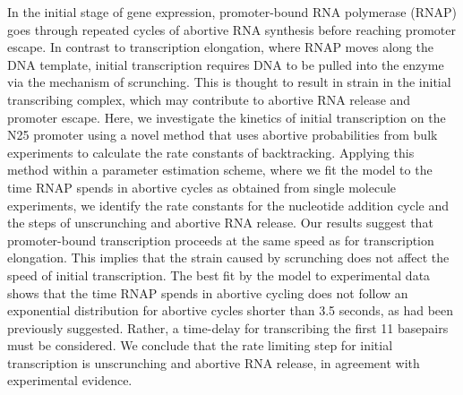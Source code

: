 In the initial stage of gene expression, promoter-bound RNA polymerase (RNAP)
goes through repeated cycles of abortive RNA synthesis before reaching
promoter escape. In contrast to transcription elongation, where RNAP moves
along the DNA template, initial transcription requires DNA to be pulled into
the enzyme via the mechanism of scrunching. This is thought to result in
strain in the initial transcribing complex, which may contribute to abortive
RNA release and promoter escape. Here, we investigate the kinetics of initial
transcription on the N25 promoter using a novel method that uses abortive
probabilities from bulk experiments to calculate the rate constants of
backtracking. Applying this method within a parameter estimation scheme, where
we fit the model to the time RNAP spends in abortive cycles as obtained from
single molecule experiments, we identify the rate constants for the nucleotide
addition cycle and the steps of unscrunching and abortive RNA release. Our
results suggest that promoter-bound transcription proceeds at the same speed
as for transcription elongation. This implies that the strain caused by
scrunching does not affect the speed of initial transcription. The best fit by
the model to experimental data shows that the time RNAP spends in abortive
cycling does not follow an exponential distribution for abortive cycles
shorter than 3.5 seconds, as had been previously suggested. Rather, a
time-delay for transcribing the first 11 basepairs must be considered. We
conclude that the rate limiting step for initial transcription is unscrunching
and abortive RNA release, in agreement with experimental evidence. 
